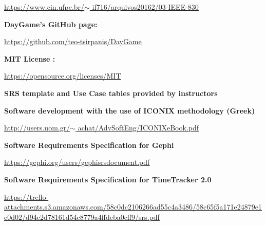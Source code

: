\documentclass[12pt]{report}
\renewcommand{\_}{\kern-1.5pt\textunderscore\kern-1.5pt}
\begin{document}
\href{https://www.cin.ufpe.br/~if716/arquivos20162/03-IEEE-830}{\textcolor[HTML]{1155CC}{\ul{https://www.cin.ufpe.br/$ \sim $ if716/arquivos20162/03-IEEE-830}}}\par


\vspace{\baselineskip}
\textbf{DayGame’s GitHub page:}\par

\href{https://github.com/teo-tsirpanis/DayGame}{\textcolor[HTML]{1155CC}{\ul{https://github.com/teo-tsirpanis/DayGame}}}\par


\vspace{\baselineskip}
\textbf{MIT License :}\par

\href{https://opensource.org/licenses/MIT}{\textcolor[HTML]{1155CC}{\ul{https://opensource.org/licenses/MIT}}}\par


\vspace{\baselineskip}
\textbf{SRS template and Use Case tables provided by instructors}\par


\vspace{\baselineskip}
\textbf{Software development with the use of ICONIX methodology (Greek)}\par

\href{http://users.uom.gr/~achat/AdvSoftEng/ICONIX_eBook.pdf}{\textcolor[HTML]{1155CC}{\ul{http://users.uom.gr/$ \sim $ achat/AdvSoftEng/ICONIX\_eBook.pdf}}}\par


\vspace{\baselineskip}
\textbf{Software Requirements Specification for Gephi}\par

\href{https://gephi.org/users/gephi_srs_document.pdf}{\textcolor[HTML]{1155CC}{\ul{https://gephi.org/users/gephi\_srs\_document.pdf}}}\par


\vspace{\baselineskip}
\textbf{Software Requirements Specification for TimeTracker 2.0}\par

\href{https://trello-attachments.s3.amazonaws.com/58c0dc2106266ad55c4a3486/58c65f5a171e24879e1e0d02/d94c2d78161d54c8779a4ffdeba0cff9/srs.pdf}{\textcolor[HTML]{1155CC}{\ul{https://trello-attachments.s3.amazonaws.com/58c0dc2106266ad55c4a3486/58c65f5a171e24879e1e0d02/d94c2d78161d54c8779a4ffdeba0cff9/srs.pdf}}}\par
\end{document}
